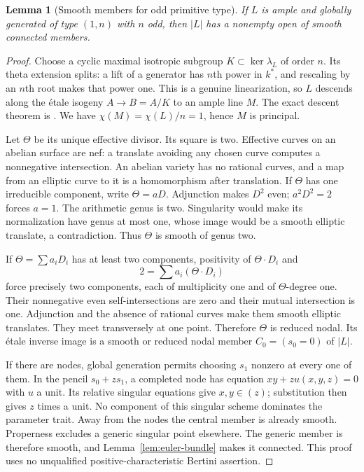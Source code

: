 \documentclass[11pt]{article}
\newtheorem{lemma}[theorem]{Lemma}
\theoremstyle{remark}\newtheorem{remark}[theorem]{Remark}
\begin{document}
\begin{lemma}[Smooth members for odd primitive type]\label{lem:smooth}
If $L$ is ample and globally generated of type $(1,n)$ with $n$ odd, then $|L|$ has a nonempty open of smooth connected members.
\end{lemma}
\begin{proof}
Choose a cyclic maximal isotropic subgroup $K\subset\ker\lambda_L$ of order $n$. Its theta extension splits: a lift of a generator has $n$th power in $k^*$, and rescaling by an $n$th root makes that power one. This is a genuine linearization, so $L$ descends along the \'etale isogeny $A\to B=A/K$ to an ample line $M$. The exact descent theorem is \citet[Theorem~8.10 and Corollary~8.11, pp.~116--117]{EGM}. We have $\chi(M)=\chi(L)/n=1$, hence $M$ is principal.

Let $\Theta$ be its unique effective divisor. Its square is two. Effective curves on an abelian surface are nef: a translate avoiding any chosen curve computes a nonnegative intersection. An abelian variety has no rational curves, and a map from an elliptic curve to it is a homomorphism after translation. If $\Theta$ has one irreducible component, write $\Theta=aD$. Adjunction makes $D^2$ even; $a^2D^2=2$ forces $a=1$. The arithmetic genus is two. Singularity would make its normalization have genus at most one, whose image would be a smooth elliptic translate, a contradiction. Thus $\Theta$ is smooth of genus two.

If $\Theta=\sum a_iD_i$ has at least two components, positivity of $\Theta\cdot D_i$ and
\[
                         2=\sum a_i(\Theta\cdot D_i)
\]
force precisely two components, each of multiplicity one and of $\Theta$-degree one. Their nonnegative even self-intersections are zero and their mutual intersection is one. Adjunction and the absence of rational curves make them smooth elliptic translates. They meet transversely at one point. Therefore $\Theta$ is reduced nodal. Its \'etale inverse image is a smooth or reduced nodal member $C_0=(s_0=0)$ of $|L|$.

If there are nodes, global generation permits choosing $s_1$ nonzero at every one of them. In the pencil $s_0+zs_1$, a completed node has equation $xy+z u(x,y,z)=0$ with $u$ a unit. Its relative singular equations give $x,y\in(z)$; substitution then gives $z$ times a unit. No component of this singular scheme dominates the parameter trait. Away from the nodes the central member is already smooth. Properness excludes a generic singular point elsewhere. The generic member is therefore smooth, and Lemma~\ref{lem:euler-bundle} makes it connected. This proof uses no unqualified positive-characteristic Bertini assertion.
\end{proof}
\end{document}
